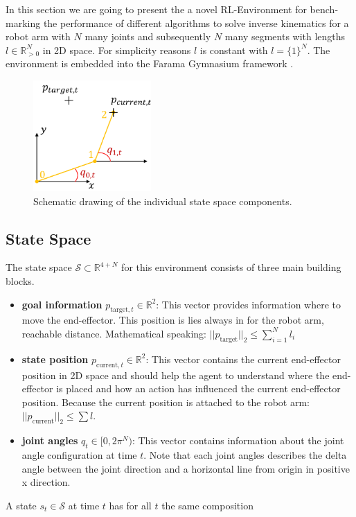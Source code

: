 In this section we are going to present the a novel RL-Environment for bench-marking the performance of different algorithms to solve inverse kinematics for a robot arm with $N$ many joints and subsequently $N$ many segments with lengths $l \in\mathbb{R}_{>0}^N$ in 2D space. For simplicity reasons $l$ is constant with $l = \{ 1 \}^N$.
The environment is embedded into the Farama Gymnasium framework \cite{Gymnasium}.

\begin{figure}[h]
	\centering
	\includegraphics[width=0.4\textwidth,]{figures/methodology/EnvExample.png}
	\caption[Plane Robot Environment]{Schematic drawing of the individual state space components.}
	\label{fig:plane_robot_env}
\end{figure}

\subsection{State Space}

The state space $\mathcal{S} \subset \mathbb{R}^{4 + N}$ for this environment consists of three main building blocks. 

\begin{itemize}
    \item \textbf{goal information} $p_{\text{target}, t} \in \mathbb{R}^2$: This vector provides information where to move the end-effector. This position is lies always in for the robot arm, reachable distance. Mathematical speaking: $||p_\text{target}||_2 \leq \sum_{i = 1}^N l_i$ 
    \item \textbf{state position} $p_{\text{current},t} \in \mathbb{R}^2$: This vector contains the current end-effector position in 2D space and should help the agent to understand where the end-effector is placed and how an action has influenced the current end-effector position. Because the current position is attached to the robot arm: $||p_\text{current}||_2 \leq \sum l$.
    \item \textbf{joint angles} $q_t \in [0, 2\pi^N)$: This vector contains information about the joint angle configuration at time $t$. Note that each joint angles describes the delta angle between the joint direction and a horizontal line from origin in positive x direction.
\end{itemize}
A state $s_t \in \mathcal{S}$ at time $t$ has for all $t$ the same composition

